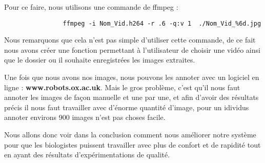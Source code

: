 \begin{flushleft}
            Pour ce faire, nous utilisons une commande de ffmpeg :
            \begin{verbatim}
                ffmpeg -i Nom_Vid.h264 -r .6 -q:v 1  ./Nom_Vid_%6d.jpg
            \end{verbatim}

            Nous remarquons que cela n'est pas simple d'utiliser cette commande, de ce fait nous avons créer une fonction permettant à l'utilisateur de choisir une vidéo ainsi que le dossier ou il souhaite enregistrées les images extraites.

            \vspace{0.2cm}

            Une fois que nous avons nos images, nous pouvons les annoter avec un logiciel en ligne : \textbf{www.robots.ox.ac.uk}.
            Mais le gros problème, c'est qu'il nous faut annoter les images de façon manuelle et une par une, et afin d'avoir des résultats précis il nous faut travailler avec d'énorme quantité d'image, pour un idividus annoter environs 900 images n'est pas choses facile.

            \vspace{0.2cm}

            Nous allons donc voir dans la conclusion comment nous améliorer notre système pour que les biologistes puissent travailler avec plus de confort et de rapidité tout en ayant des résultats d'expérimentations de qualité.
        \end{flushleft}
